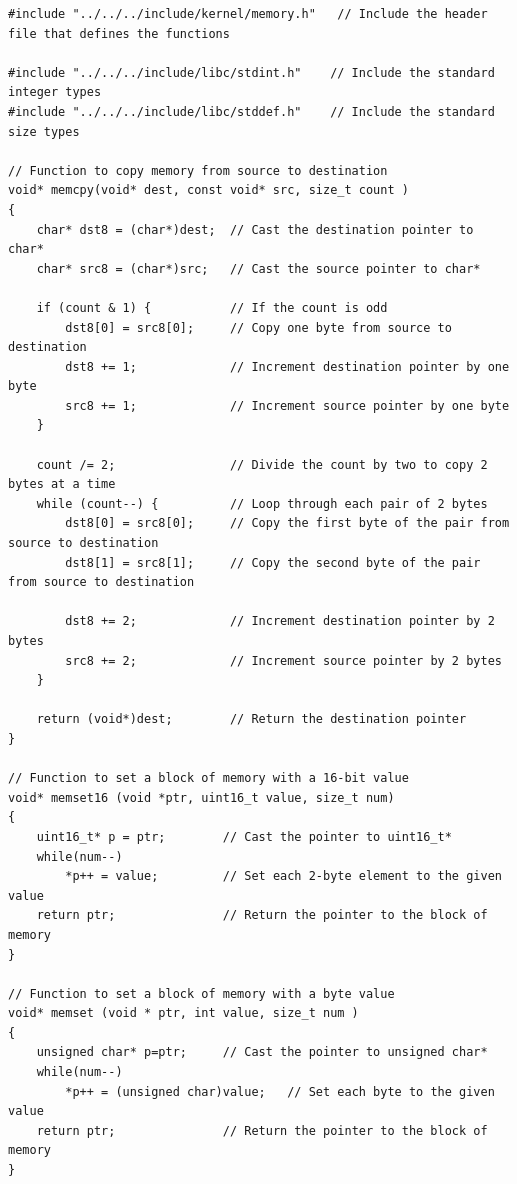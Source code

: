 \documentclass[../main.tex]{subfiles}
\begin{document}
\label{lst:memutils_c}
\begin{verbatim}
#include "../../../include/kernel/memory.h"   // Include the header file that defines the functions

#include "../../../include/libc/stdint.h"    // Include the standard integer types
#include "../../../include/libc/stddef.h"    // Include the standard size types

// Function to copy memory from source to destination
void* memcpy(void* dest, const void* src, size_t count )
{
    char* dst8 = (char*)dest;  // Cast the destination pointer to char*
    char* src8 = (char*)src;   // Cast the source pointer to char*

    if (count & 1) {           // If the count is odd
        dst8[0] = src8[0];     // Copy one byte from source to destination
        dst8 += 1;             // Increment destination pointer by one byte
        src8 += 1;             // Increment source pointer by one byte
    }

    count /= 2;                // Divide the count by two to copy 2 bytes at a time
    while (count--) {          // Loop through each pair of 2 bytes
        dst8[0] = src8[0];     // Copy the first byte of the pair from source to destination
        dst8[1] = src8[1];     // Copy the second byte of the pair from source to destination

        dst8 += 2;             // Increment destination pointer by 2 bytes
        src8 += 2;             // Increment source pointer by 2 bytes
    }

    return (void*)dest;        // Return the destination pointer
}

// Function to set a block of memory with a 16-bit value
void* memset16 (void *ptr, uint16_t value, size_t num)
{
    uint16_t* p = ptr;        // Cast the pointer to uint16_t*
    while(num--)
        *p++ = value;         // Set each 2-byte element to the given value
    return ptr;               // Return the pointer to the block of memory
}

// Function to set a block of memory with a byte value
void* memset (void * ptr, int value, size_t num )
{
    unsigned char* p=ptr;     // Cast the pointer to unsigned char*
    while(num--)
        *p++ = (unsigned char)value;   // Set each byte to the given value
    return ptr;               // Return the pointer to the block of memory
}

\end{verbatim}
\end{document}
